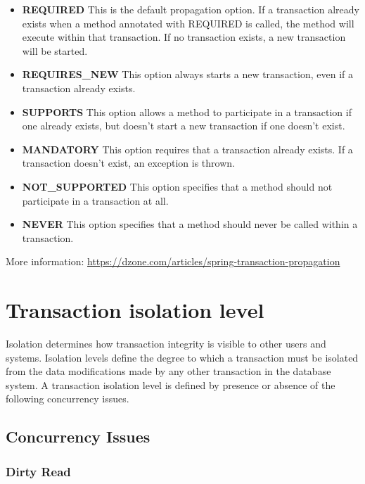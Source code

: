 \begin{itemize}
\item \textbf{REQUIRED} This is the default propagation option. If a transaction already exists when a method annotated with REQUIRED is called, the method will execute within that transaction. If no transaction exists, a new transaction will be started.

\item \textbf{REQUIRES\_NEW} This option always starts a new transaction, even if a transaction already exists.

\item \textbf{SUPPORTS} This option allows a method to participate in a transaction if one already exists, but doesn’t start a new transaction if one doesn’t exist.

\item \textbf{MANDATORY} This option requires that a transaction already exists. If a transaction doesn’t exist, an exception is thrown.

\item \textbf{NOT\_SUPPORTED} This option specifies that a method should not participate in a transaction at all.

\item \textbf{NEVER} This option specifies that a method should never be called within a transaction.
\end{itemize}

More information: \url{https://dzone.com/articles/spring-transaction-propagation}

\section{Transaction isolation level}

Isolation determines how transaction integrity is visible to other users and systems.
Isolation levels define the degree to which a transaction must be isolated from the data modifications made by any other transaction in the database system. A transaction isolation level is defined by presence or absence of the following concurrency issues. 

\subsection{Concurrency Issues}

\subsubsection{Dirty Read}

